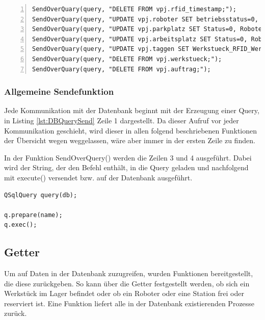 \begin{lstlisting}[frame=single, breaklines=true, numbers=left, stepnumber=2, firstnumber=1, numberstyle = \tiny, caption=Databank-Handler Initialisierung ,label=lst:DBInit]
SendOverQuary(query, "DELETE FROM vpj.rfid_timestamp;");
SendOverQuary(query, "UPDATE vpj.roboter SET betriebsstatus=0, Werkstueck_RFID_Werkstueck=NULL;");
SendOverQuary(query, "UPDATE vpj.parkplatz SET Status=0, Roboter_id_Roboter=NULL;");
SendOverQuary(query, "UPDATE vpj.arbeitsplatz SET Status=0, Roboter_id_Roboter=NULL, Werkstueck_RFID_Werkstueck=NULL;");
SendOverQuary(query, "UPDATE vpj.taggen SET Werkstueck_RFID_Werkstueck=NULL WHERE id_taggen=1;");
SendOverQuary(query, "DELETE FROM vpj.werkstueck;");
SendOverQuary(query, "DELETE FROM vpj.auftrag;");
\end{lstlisting}

\subsubsection{Allgemeine Sendefunktion}

Jede Kommunikation mit der Datenbank beginnt mit der Erzeugung einer Query, in Listing \ref{lst:DBQuerySend} Zeile 1 dargestellt. Da dieser Aufruf vor jeder Kommunikation geschieht, wird dieser in allen folgend beschriebenen Funktionen der Übersicht wegen weggelassen, wäre aber immer in der ersten Zeile zu finden.

In der Funktion SendOverQuery() werden die Zeilen 3 und 4 ausgeführt. Dabei wird der String, der den Befehl enthält, in die Query geladen und nachfolgend mit execute() versendet bzw. auf der Datenbank ausgeführt. 

\begin{lstlisting}[frame=single, breaklines=true, caption=Databank-Handler Senden über Query ,label=lst:DBQuerySend]
QSqlQuery query(db);

q.prepare(name);
q.exec();
\end{lstlisting}

\subsection{Getter}

Um auf Daten in der Datenbank zuzugreifen, wurden Funktionen bereitgestellt, die diese zurückgeben. So kann über die Getter festgestellt werden, ob sich ein Werkstück im Lager befindet oder ob ein Roboter oder eine Station frei oder reserviert ist. Eine Funktion liefert alle in der Datenbank existierenden Prozesse zurück. 

